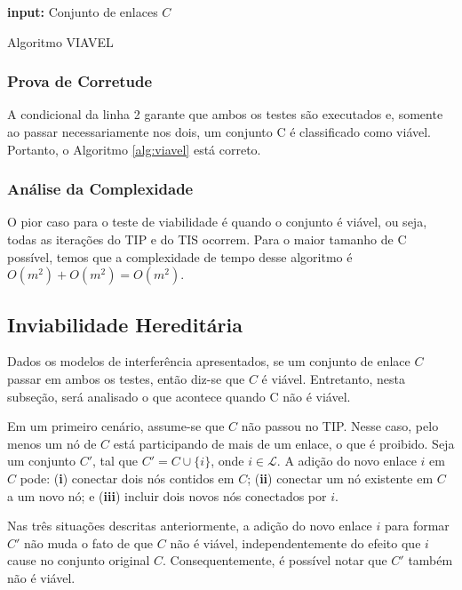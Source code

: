 \begin{algorithm}[h]
	\SetVline
	{\bf input:} Conjunto de enlaces $C$\\
\caption{Algoritmo VIAVEL}
\label{alg:viavel}
\end{algorithm}

\subsubsection{Prova de Corretude}

A condicional da linha 2 garante que ambos os testes são executados e, somente ao passar necessariamente nos dois, um conjunto C é classificado como viável. Portanto, o Algoritmo \ref{alg:viavel} está correto.

\subsubsection{Análise da Complexidade}

O pior caso para o teste de viabilidade é quando o conjunto é viável, ou seja, todas as iterações do TIP e do TIS ocorrem. Para o maior tamanho de C possível, temos que a complexidade de tempo desse algoritmo é $O(m^2)+O(m^2)=O(m^2)$.

\subsection{Inviabilidade Hereditária}

Dados os modelos de interferência apresentados, se um conjunto de enlace $C$ passar em ambos os testes, então diz-se que $C$ é viável. Entretanto, nesta subseção, será analisado o que acontece quando C não é viável.

Em um primeiro cenário, assume-se que $C$ não passou no TIP. Nesse caso, pelo menos um nó de $C$ está participando de mais de um enlace, o que é proibido. Seja um conjunto $C'$, tal que $C' = C \cup \{i\}$, onde $i \in \mathcal{L}$. A adição do novo enlace $i$ em $C$ pode: ({\bf i}) conectar dois nós contidos em $C$; ({\bf ii}) conectar um nó existente em $C$ a um novo nó; e ({\bf iii}) incluir dois novos nós conectados por $i$. 
  
Nas três situações descritas anteriormente, a adição do novo enlace $i$ para formar $C'$ não muda o fato de que $C$ não é viável, independentemente do efeito que $i$ cause no conjunto original $C$. Consequentemente, é possível notar que $C'$ também não é viável.

